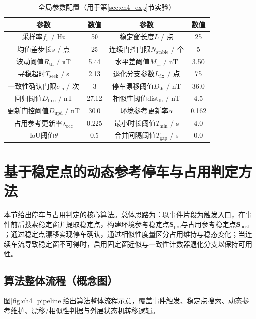 \begin{table}[ht]
    \centering
    \caption{全局参数配置（用于第\ref{sec:ch4_exp}节实验）}
    \label{tab:ch4_global_params}
    \begin{tabular}{cc|cc}
        \hline
        参数 & 数值 & 参数 & 数值 \\
        \hline
        采样率$f_s$ / Hz & 50 & 稳定窗长度$L$ / 点 & 25 \\
        均值差步长$s$ / 点 & 25 & 连续门控门限$N_{\mathrm{stable}}$ / 个 & 5 \\
        波动阈值$R_{\mathrm{th}}$ / nT & 5.44 & 水平差阈值$M_{\mathrm{th}}$ / nT & 3.50 \\
        寻稳超时$T_{\mathrm{seek}}$ / s & 2.13 & 退化分支参数$L_{\mathrm{fix}}$ / 点 & 75 \\
        一致性确认门限$c_{\mathrm{th}}$ / 次 & 3 & 停车漂移阈值$D_{\mathrm{th}}$ / nT & 36.0 \\
        回归阈值$D_{\mathrm{free}}$ / nT & 27.12 & 相似性阈值$\mathrm{dist}_{\mathrm{th}}$ / nT & 4.5 \\
        更新门控阈值$D_{\mathrm{upd}}$ / nT & 30.0 & 环境参考更新率$\alpha$ & 0.162 \\
        占用参考更新率$\lambda_{\mathrm{occ}}$ & 0.225 & 最小时长阈值$T_{\min}$ / s & 4.0 \\
        IoU阈值$\theta$ & 0.5 & 合并间隔阈值$T_{\mathrm{gap}}$ / s & 0.0 \\
        \hline
    \end{tabular}
\end{table}

\section{基于稳定点的动态参考停车与占用判定方法}
\label{sec:ch4_method}

本节给出停车与占用判定的核心算法。总体思路为：以事件片段为触发入口，在事件前后搜索稳定窗并提取稳定点，构建环境参考稳定点$\mathbf{S}_{\mathrm{pre}}$与占用参考稳定点$\mathbf{S}_{\mathrm{post}}$；通过稳定点漂移实现停车确认，通过相似性度量区分占用维持与稳态变化；当连续车流导致稳定窗不可得时，启用固定窗近似与一致性计数器退化分支以保持可用性。

\subsection{算法整体流程（概念图）}
\label{subsec:ch4_pipeline}

图\ref{fig:ch4_pipeline}给出算法整体流程示意，覆盖事件触发、稳定点搜索、动态参考维护、漂移/相似性判据与外层状态机转移逻辑。


